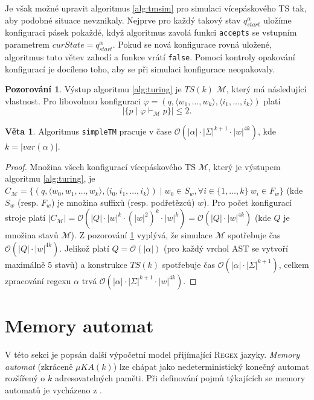 \documentclass[thesis=B,czech]{FITthesis}[2019/12/23]
\theoremstyle{definition}
\newtheorem{theorem}{Věta}[chapter]
\newtheorem{pozorovani}{Pozorování}[chapter]
\begin{document}
Je však možné upravit algoritmus \ref{alg:tmsim} pro simulaci vícepáskového TS tak, aby podobné situace nevznikaly. Nejprve pro každý takový stav $q_{start}^\alpha$ uložíme konfiguraci pásek pokaždé, když algoritmus zavolá funkci \texttt{accepts} se vstupním parametrem $curState = q_{start}^\alpha$. Pokud se nová konfigurace rovná uložené, algoritmus tuto větev zahodí a funkce vrátí \texttt{false}. Pomocí kontroly opakování konfigurací je docíleno toho, aby se při simulaci konfigurace neopakovaly.  
\begin{pozorovani}\label{poz:out}Výstup algoritmu \ref{alg:turing} je $TS(k)$ $\mathcal{M}$, který má následující vlastnost. Pro libovolnou konfiguraci $\varphi = \left(q, \langle w_1, \dots, w_k\rangle,  \langle i_1, \dots, i_k\rangle\right)$ platí $$|\{p  \mid \varphi \vdash_\mathcal{M} p\}|\le2.$$
\end{pozorovani}
\begin{theorem}Algoritmus \texttt{simpleTM} pracuje v čase $\mathcal{O}(|\alpha|\cdot|\Sigma|^{k+1}\cdot|w|^{4k})$, kde $k = |var(\alpha)|$. \end{theorem}
\begin{proof}
Množina všech konfigurací vícepáskového TS $\mathcal{M}$, který je výstupem algoritmu \ref{alg:turing}, je $C_{\mathcal{M}}= \{\left(q, \langle w_0, w_1, \dots, w_k\rangle,  \langle i_0, i_1, \dots, i_k\rangle\right) \mid w_0 \in S_w, \forall i \in \{1, \dots, k\} \ w_i \in F_w\}$ (kde $S_w$ (resp. $F_w$) je množina suffixů (resp. podřetězců) $w$). Pro počet konfigurací stroje platí $|C_{\mathcal{M}}| = \mathcal{O}(|Q|\cdot|w|^k \cdot (|w|^2)^k \cdot |w|^{k} ) = \mathcal{O}(|Q|\cdot|w|^{4k})$ (kde $Q$ je množina stavů $\mathcal{M}$).
Z pozorování \ref{poz:out} vyplývá, že simulace $\mathcal{M}$ spotřebuje čas $\mathcal{O}(|Q|\cdot|w|^{4k})$. Jelikož platí $Q=\mathcal{O}(|\alpha|)$ (pro každý vrchol AST se vytvoří maximálně 5 stavů) a konstrukce $TS(k)$ spotřebuje čas $\mathcal{O}(|\alpha|\cdot|\Sigma|^{k+1})$, celkem zpracování regexu $\alpha$ trvá $\mathcal{O}(|\alpha|\cdot|\Sigma|^{k+1}\cdot|w|^{4k})$.
\end{proof}

\section{Memory automat}\label{sec:memory}
V této sekci je popsán další výpočetní model přijímající \textsc{Regex} jazyky. \emph{Memory automat} (zkráceně $\mu KA(k)$) lze chápat jako nedeterministický konečný automat rozšířený o $k$ adresovatelných paměti. Při definování pojmů týkajících se memory automatů je vycházeno z \cite[sekce 2.2]{schmidref}.
\end{document}
